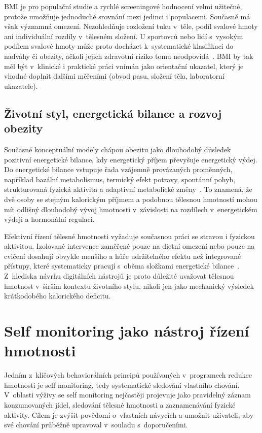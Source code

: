 BMI je pro populační studie a rychlé screeningové hodnocení velmi užitečné, protože umožňuje jednoduché srovnání mezi jedinci i populacemi.
Současně má však významná omezení.
Nezohledňuje rozložení tuku v~těle, podíl svalové hmoty ani individuální rozdíly v~tělesném složení.
U sportovců nebo lidí s~vysokým podílem svalové hmoty může proto docházet k~systematické klasifikaci do nadváhy či obezity, ačkoli jejich zdravotní riziko tomu neodpovídá~\cite{theodorakis2025humanEnergyBalance}.
BMI by tak měl být v~klinické i praktické práci vnímán jako orientační ukazatel, který je vhodné doplnit dalšími měřeními (obvod pasu, složení těla, laboratorní ukazatele).

\subsection{Životní styl, energetická bilance a rozvoj obezity}
\label{subsec:zivotniStyl}

Současné konceptuální modely chápou obezitu jako dlouhodobý důsledek pozitivní energetické bilance, kdy energetický příjem převyšuje energetický výdej.
Do energetické bilance vstupuje řada vzájemně provázaných proměnných, například bazální metabolismus, termický efekt potravy, spontánní pohyb, strukturovaná fyzická aktivita a adaptivní metabolické změny~\cite{theodorakis2025humanEnergyBalance}.
To znamená, že dvě osoby se stejným kalorickým příjmem a podobnou tělesnou hmotností mohou mít odlišný dlouhodobý vývoj hmotnosti v~závislosti na rozdílech v~energetickém výdeji a hormonální regulaci.

Efektivní řízení tělesné hmotnosti vyžaduje současnou práci se stravou i fyzickou aktivitou.
Izolované intervence zaměřené pouze na dietní omezení nebo pouze na cvičení dosahují obvykle menšího a hůře udržitelného efektu než integrované přístupy, které systematicky pracují s~oběma složkami energetické bilance~\cite{drenowatz2025integrating}.
Z~hlediska návrhu digitálních nástrojů je proto důležité uvažovat tělesnou hmotnost v~širším kontextu životního stylu, nikoli jen jako mechanický výsledek krátkodobého kalorického deficitu.

\section{Self monitoring jako nástroj řízení hmotnosti}
\label{sec:selfMonitoring}

Jedním z~klíčových behaviorálních principů používaných v~programech redukce hmotnosti je self monitoring, tedy systematické sledování vlastního chování.
V~oblasti výživy se self monitoring nejčastěji projevuje jako pravidelný záznam konzumovaných jídel, sledování tělesné hmotnosti a zaznamenávání fyzické aktivity.
Cílem je zvýšit povědomí o~vlastních návycích a umožnit uživateli, aby své chování průběžně upravoval v~souladu s~doporučeními.

